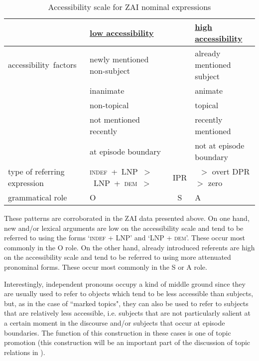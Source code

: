 \begin{table}
\small
\begin{tabularx}{\textwidth}{Ql@{}c@{}l}
\lsptoprule
   
&   \textbf{\uline{low accessibility}}  &  &  \textbf{\uline{high accessibility}}  \\
  
 
\midrule 

\mbox{accessibility factors} &  newly mentioned non-subject  &   & already mentioned  subject  \\
 
		      &    inanimate  &  & animate  \\
		      &     non-topical  &   & topical  \\
		      &      not mentioned recently  &  & recently mentioned   \\
		      &      at episode boundary  &   & not at episode boundary \\
       
  
\midrule
 
type of referring expression & \mbox{\textsc{indef}  + LNP $>$ LNP + \textsc{dem}  $>$} &    IPR   &~$>$  overt DPR $>$ zero \\
 

 
\midrule 
  grammatical role & \hfill O \hfill &  S &\hfill A \hfill\\ 
\midrule

\end{tabularx}
\caption{{Accessibility scale for ZAI nominal expressions}}
\label{accessibilityscale}

\end{table}
 
These patterns are corroborated in the ZAI data presented above. On one hand, new and/or lexical arguments are low on the accessibility scale and tend to be referred to using the forms `\textsc{indef}  + LNP' and `LNP + \textsc{dem}'. These occur most commonly in the O role. On the other hand, already introduced referents are high on the accessibility scale and tend to be referred to using more attenuated pronominal forms. These occur most commonly in the S or A role. 

Interestingly, independent pronouns occupy a kind of middle ground since they are usually used to refer to objects which tend to be less accessible than subjects, but, as in the case of ``marked topics", they can also be used to refer to subjects that are relatively less accessible, i.e. subjects that are not particularly salient at a certain moment in the discourse and/or subjects that occur at episode boundaries. The function of this construction in these cases is one of topic promotion (this construction will be an important part of the discussion of topic relations in ).

